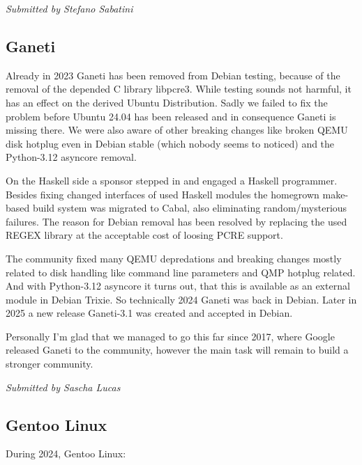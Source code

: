 \documentclass[a4paper]{report}
\begin{document}
{\em Submitted by Stefano Sabatini}

\subsection{Ganeti}

Already in 2023 Ganeti has been removed from Debian testing, because of the removal of the depended C library libpcre3. While testing sounds not harmful, it has an effect on the derived Ubuntu Distribution. Sadly we failed to fix the problem before Ubuntu 24.04 has been released and in consequence Ganeti is missing there. We were also aware of other breaking changes like broken QEMU disk hotplug even in Debian stable (which nobody seems to noticed) and the Python-3.12 asyncore removal.

On the Haskell side a sponsor stepped in and engaged a Haskell programmer. Besides fixing changed interfaces of used Haskell modules the homegrown make-based build system was migrated to Cabal, also eliminating random/mysterious failures. The reason for Debian removal has been resolved by replacing the used REGEX library at the acceptable cost of loosing PCRE support.

The community fixed many QEMU depredations and breaking changes mostly related to disk handling like command line parameters and QMP hotplug related. And with Python-3.12 asyncore it turns out, that this is available as an external module in Debian Trixie. So technically 2024 Ganeti was back in Debian. Later in 2025 a new release Ganeti-3.1 was created and accepted in Debian.

Personally I'm glad that we managed to go this far since 2017, where Google released Ganeti to the community, however the main task will remain to build a stronger community.

{\em Submitted by Sascha Lucas}

\subsection{Gentoo Linux}

During 2024, Gentoo Linux:
\end{document}
